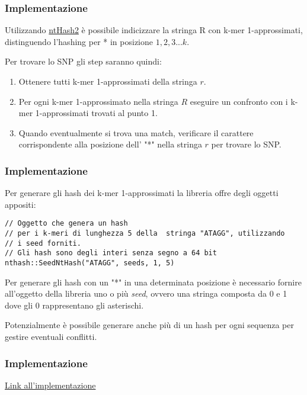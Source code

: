 \documentclass[
	11pt, %
]{beamer}
\begin{document}
\begin{frame}
	\frametitle{Implementazione}
	
	Utilizzando  \href{https://github.com/bcgsc/ntHash}{ntHash2} è possibile indicizzare la stringa R con k-mer 1-approssimati, distinguendo l'hashing per * in posizione $1,2,3...k$.
	
	Per trovare lo SNP gli step saranno quindi:
\begin{enumerate} 
	\item	Ottenere tutti k-mer 1-approssimati della stringa $r$.
	\item  Per ogni k-mer 1-approssimato nella stringa $R$ eseguire un confronto con i k-mer 1-approssimati trovati al punto 1.
	\item Quando eventualmente si trova una match, verificare il carattere corrispondente alla posizione dell' "*" nella stringa $r$ per trovare lo SNP.
\end{enumerate}
	

\end{frame}


\begin{frame}[fragile]
	\frametitle{Implementazione}
	Per generare gli hash dei k-mer 1-approssimati la libreria offre degli oggetti appositi:
	
\begin{lstlisting}
// Oggetto che genera un hash
// per i k-meri di lunghezza 5 della  stringa "ATAGG", utilizzando
// i seed forniti.
// Gli hash sono degli interi senza segno a 64 bit
nthash::SeedNtHash("ATAGG", seeds, 1, 5)
\end{lstlisting}
	
	Per generare gli hash con un "*" in una determinata posizione è necessario fornire all'oggetto della libreria uno o più \textit{seed},  ovvero una stringa composta da 0 e 1 dove gli 0 rappresentano gli asterischi.
	
	Potenzialmente è possibile generare anche più di un hash per ogni sequenza per gestire eventuali conflitti.
	
\end{frame}
\begin{frame}[fragile]
	\frametitle{Implementazione}

	\href{	https://mbeccari856608.github.io/BioInformatica2023/}{Link all'implementazione}

	
\end{frame}

\end{document}
